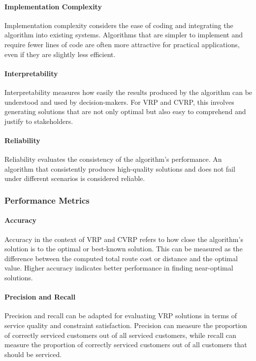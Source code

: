 \documentclass[
]{article}
\begin{document}
    \paragraph{Implementation Complexity} Implementation complexity considers the ease of coding and integrating the algorithm into existing systems. Algorithms that are simpler to implement and require fewer lines of code are often more attractive for practical applications, even if they are slightly less efficient.

    \paragraph{Interpretability} Interpretability measures how easily the results produced by the algorithm can be understood and used by decision-makers. For VRP and CVRP, this involves generating solutions that are not only optimal but also easy to comprehend and justify to stakeholders.

    \paragraph{Reliability} Reliability evaluates the consistency of the algorithm’s performance. An algorithm that consistently produces high-quality solutions and does not fail under different scenarios is considered reliable.

    \subsubsection{Performance Metrics}
    \label{subsubsec:performance_metrics}

    \paragraph{Accuracy} Accuracy in the context of VRP and CVRP refers to how close the algorithm’s solution is to the optimal or best-known solution. This can be measured as the difference between the computed total route cost or distance and the optimal value. Higher accuracy indicates better performance in finding near-optimal solutions.

    \paragraph{Precision and Recall} Precision and recall can be adapted for evaluating VRP solutions in terms of service quality and constraint satisfaction. Precision can measure the proportion of correctly serviced customers out of all serviced customers, while recall can measure the proportion of correctly serviced customers out of all customers that should be serviced.
\end{document}
